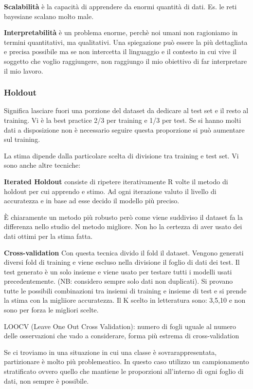 \textbf{Scalabilit\`a} \`e la capacit\`a di apprendere da enormi quantit\`a di dati. Es. le reti bayesiane scalano molto male. 

\textbf{Interpretabilit\`a} \`e un problema enorme, perch\`e noi umani non ragioniamo in termini quantitativi, ma qualitativi. Una spiegazione pu\`o essere la pi\`u dettagliata e precisa possibile ma se non intercetta il linguaggio e il contesto in cui vive il soggetto che voglio raggiungere, non raggiungo il mio obiettivo di far interpretare il mio lavoro.

\subsubsection{Holdout}
Significa lasciare fuori una porzione del dataset da dedicare al test set e il resto al training. Vi \`e la best practice 2/3 per training e 1/3 per test. Se si hanno molti dati a disposizione non \`e necessario seguire questa proporzione si pu\`o aumentare sul training.

La stima dipende dalla particolare scelta di divisione tra training e test set. Vi sono anche altre tecniche:

\textbf{Iterated Holdout} consiste di ripetere iterativamente R volte il metodo di holdout per cui apprendo e stimo. Ad ogni iterazione valuto il livello di accuratezza e in base ad esse decido il modello pi\`u preciso.

\`E chiaramente un metodo pi\`u robusto per\`o come viene suddiviso il dataset fa la differenza nello studio del metodo migliore. Non ho la certezza di aver usato dei dati ottimi per la stima fatta. 

\textbf{Cross-validation} 
Con questa tecnica divido il fold il dataset. Vengono generati diversi fold di training e viene escluso nella divisione il foglio di dati dei test. Il test generato \`e un solo insieme e viene usato per testare tutti i modelli usati precedentemente. (NB: considero sempre solo dati non duplicati). Si provano tutte le possibili combinazioni tra insiemi di training e insieme di test e si prende la stima con la migliiore accuratezza. 
Il K scelto in letteratura sono: 3,5,10 e non sono per forza le migliori scelte.

LOOCV (Leave One Out Cross Validation): numero di fogli uguale al numero delle osservazioni che vado a considerare, forma pi\`u estrema di cross-validation

Se ci troviamo in una situazione in cui una classe \`e sovrarappresentata, partizionare \`e molto pi\`u problemeatico. In questo caso utilizzo un campionamento stratificato ovvero quello che mantiene le proporzioni all'interno di ogni foglio di dati, non sempre \`e possibile. 


